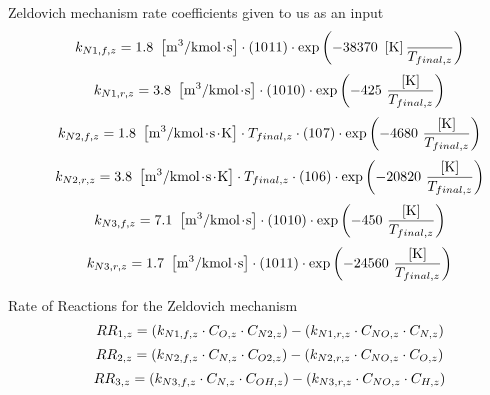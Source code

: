 \documentclass[10pt,fleqn]{article}
\newcommand{\V}[1]{\mbox{$ #1 $}}
\newcommand{\I}{\mbox{\hspace{0.20in}}}
\begin{document}
\vspace{0.04in}
\noindent
\rm Zeldovich mechanism rate coefficients given to us as an input
\begin{equation}
\I \label{EES Eqn:96}
k_{N1,f,z} = 1.8   \   \left[ \rm m^{3}/kmol^{} \! \cdot \!s \right]                     \cdot   \left( 10 ^{} 11 \right) 	\cdot  \exp{ \left( -38370   \   \left[ \rm K \right] \frac {}{ T_{final,z} } \right) } 
\end{equation}
\rm
\begin{equation}
\I \label{EES Eqn:97}
k_{N1,r,z} = 3.8   \   \left[ \rm m^{3}/kmol^{} \! \cdot \!s \right]                     \cdot   \left( 10 ^{} 10 \right) 	\cdot  \exp{ \left( -425       \   \frac {\left[ \rm K \right]}{ T_{final,z} } \right) } 
\end{equation}
\rm
\begin{equation}
\I \label{EES Eqn:98}
k_{N2,f,z} = 1.8   \   \left[ \rm m^{3}/kmol^{} \! \cdot \!s^{} \! \cdot \!K \right] \cdot  T_{final,z}  \cdot   \left( 10 ^{} 7 \right)    \cdot  \exp{ \left( -4680     \   \frac {\left[ \rm K \right]}{ T_{final,z} } \right) } 
\end{equation}
\rm
\begin{equation}
\I \label{EES Eqn:99}
k_{N2,r,z} = 3.8   \   \left[ \rm m^{3}/kmol^{} \! \cdot \!s^{} \! \cdot \!K \right] \cdot  T_{final,z}  \cdot   \left( 10 ^{} 6 \right)    \cdot  \exp{ \left( -20820   \   \frac {\left[ \rm K \right]}{ T_{final,z} } \right) } 
\end{equation}
\rm
\begin{equation}
\I \label{EES Eqn:100}
k_{N3,f,z} = 7.1   \   \left[ \rm m^{3}/kmol^{} \! \cdot \!s \right]                     \cdot   \left( 10 ^{} 10 \right) 	\cdot  \exp{ \left( -450       \   \frac {\left[ \rm K \right]}{ T_{final,z} } \right) } 
\end{equation}
\rm
\begin{equation}
\I \label{EES Eqn:101}
k_{N3,r,z} = 1.7   \   \left[ \rm m^{3}/kmol^{} \! \cdot \!s \right]                     \cdot   \left( 10 ^{} 11 \right) 	\cdot  \exp{ \left( -24560   \   \frac {\left[ \rm K \right]}{ T_{final,z} } \right) } 
\end{equation}
\rm

\vspace{0.04in}
\noindent
\rm Rate of Reactions for the Zeldovich mechanism
\begin{equation}
\I \label{EES Eqn:102}
\V{RR} _{1,z} =  \left( k_{N1,f,z} \cdot  C_{O,z} \cdot  C_{N2,z} \right)  -  \left( k_{N1,r,z} \cdot  C_{NO,z} \cdot  C_{N,z} \right)  
\end{equation}
\begin{equation}
\I \label{EES Eqn:103}
\V{RR} _{2,z} =  \left( k_{N2,f,z} \cdot  C_{N,z} \cdot  C_{O2,z} \right)  -  \left( k_{N2,r,z} \cdot  C_{NO,z} \cdot  C_{O,z} \right)  
\end{equation}
\begin{equation}
\I \label{EES Eqn:104}
\V{RR} _{3,z} =  \left( k_{N3,f,z} \cdot  C_{N,z} \cdot  C_{OH,z} \right)  -  \left( k_{N3,r,z} \cdot  C_{NO,z} \cdot  C_{H,z} \right)  
\end{equation}
\end{document}
